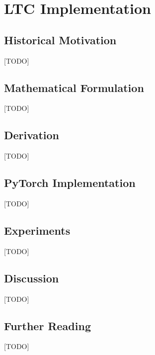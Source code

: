 
\chapter{LTC Implementation}
\label{ch:08_ltc_implementation}


\section{Historical Motivation}
[TODO]

\section{Mathematical Formulation}
[TODO]

\section{Derivation}
[TODO]

\section{PyTorch Implementation}
[TODO]

\section{Experiments}
[TODO]

\section{Discussion}
[TODO]

\section{Further Reading}
[TODO]
